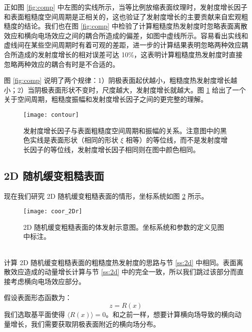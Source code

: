 正如图 \ref{fig:comp} 中左图的实线所示，当等比例放缩表面纹理时，发射度增长因子和表面粗糙度空间周期是正相关的，这也验证了发射度增长的主要贡献来自宏观粗糙度的结论。我们也在图 \ref{fig:comp} 中检验了计算粗糙度热发射度时忽略表面离散效应和横向电场效应之间的耦合所造成的偏差，如图中虚线所示。容易看出实线和虚线间在某些空间周期时有着可观的差距，进一步的计算结果表明忽略两种效应耦合所造成的发射度增长的相对误差可达 10\%，这表明计算粗糙度热发射度时直接忽略两种效应的耦合有时是不合适的。

图 \ref{fig:comp} 说明了两个规律：1）阴极表面起伏越小，粗糙度热发射度增长越小；2）当阴极表面形状不变时，尺度越大，发射度增长就越大。图 \ref{fig:contour} 给出了一个关于空间周期，粗糙度振幅和发射度增长因子之间的更完整的理解。

\begin{figure}[htbp]
\centering
\texttt{[image: contour]}
\caption{\label{fig:contour} 发射度增长因子与表面粗糙度空间周期和振幅的关系。注意图中的黑色实线是表面形状（相同的形状 $\xi$ 相等）的等位线，而不是发射度增长因子的等位线，发射度增长因子相同则在图中颜色相同。}
\end{figure}

\subsection{\label{ss:2dr}2D 随机缓变粗糙表面}
现在我们研究 2D 随机缓变粗糙表面的情形，坐标系统如图 \ref{fig:coor_2Dr} 所示。
\begin{figure}[htbp]
\centering
\texttt{[image: coor\_2Dr]}
\caption{\label{fig:coor_2Dr} 2D 随机缓变粗糙表面的体发射示意图。坐标系统和参数的定义见图中标注。}
\end{figure}\\
计算 2D 随机缓变粗糙表面的粗糙度热发射度的思路与节 \ref{ss:2d} 中相同。表面离散效应造成的动量增长计算与节  \ref{ss:2d} 中的完全一致，所以我们跳过该部分而直接考虑横向电场效应部分。

假设表面形态函数为：
\[
z = R(x)
\]
我们选取基平面使得 $\langle R(x)\rangle=0$。和之前一样，想要计算横向场导致的横向动量增长，我们需要获取阴极表面附近的横向场分布。

